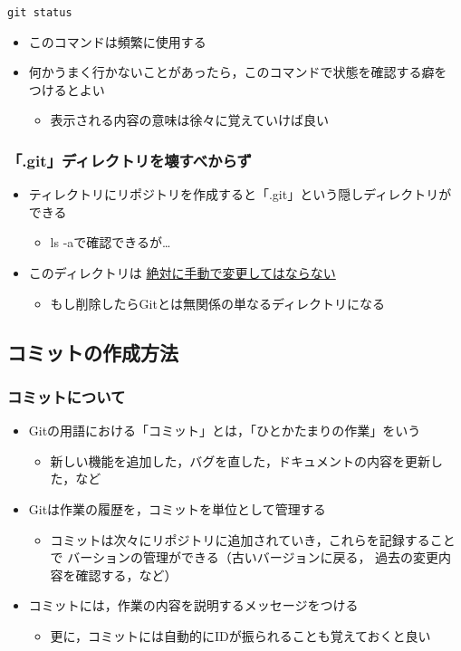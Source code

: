 \documentclass[a4paper,twoside,twocolumn]{bxjsarticle}
\begin{document}
\begin{verbatim}
git status
\end{verbatim}

\begin{itemize}
\item このコマンドは頻繁に使用する
\item 何かうまく行かないことがあったら，このコマンドで状態を確認する癖を
つけるとよい
\begin{itemize}
\item 表示される内容の意味は徐々に覚えていけば良い
\end{itemize}
\end{itemize}

\subsubsection{「.git」ディレクトリを壊すべからず}
\label{sec-1-2-5}
\begin{itemize}
\item ティレクトリにリポジトリを作成すると「.git」という隠しディレクトリが
できる
\begin{itemize}
\item ls -aで確認できるが…
\end{itemize}
\item このディレクトリは \uline{絶対に手動で変更してはならない}
\begin{itemize}
\item もし削除したらGitとは無関係の単なるディレクトリになる
\end{itemize}
\end{itemize}

\subsection{コミットの作成方法}
\label{sec-1-3}
\subsubsection{コミットについて}
\label{sec-1-3-1}
\begin{itemize}
\item Gitの用語における「コミット」とは，「ひとかたまりの作業」をいう
\begin{itemize}
\item 新しい機能を追加した，バグを直した，ドキュメントの内容を更新した，など
\end{itemize}
\item Gitは作業の履歴を，コミットを単位として管理する
\begin{itemize}
\item コミットは次々にリポジトリに追加されていき，これらを記録することで
バーションの管理ができる（古いバージョンに戻る，
過去の変更内容を確認する，など）
\end{itemize}
\item コミットには，作業の内容を説明するメッセージをつける
\begin{itemize}
\item 更に，コミットには自動的にIDが振られることも覚えておくと良い
\end{itemize}
\end{itemize}
\end{document}
